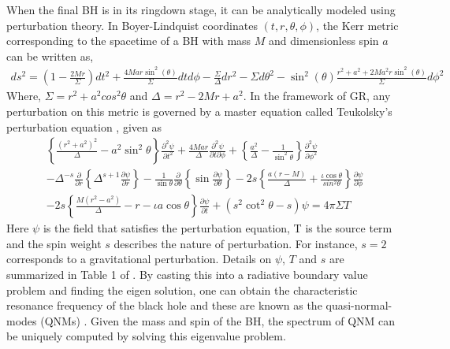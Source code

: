 When the final BH is in its ringdown stage, it can be analytically modeled using perturbation theory. In Boyer-Lindquist coordinates $(t, r, \theta, \phi )$, the Kerr metric corresponding to the spacetime of a BH with mass $M$ and dimensionless spin $a$ can be written as, 
\begin{align}
ds^{2}=(1 - \frac{2Mr}{\Sigma})dt^{2} + \frac{4Mar \sin^{2}(\theta)}{\Sigma} dtd\phi - \frac{\Sigma}{\Delta} dr^{2} - \Sigma d\theta^{2} -\sin^{2}(\theta)\frac{r^{2}+a^{2}+2Ma^{2}r \sin^{2}(\theta)}{\Sigma} d\phi^{2} 
\end{align}
Where, $\Sigma = r^{2} + a^{2} cos^{2} \theta$ and $\Delta = r^{2} - 2Mr + a^{2}$. In the framework of GR, any perturbation on this metric is governed by a master equation called Teukolsky's perturbation equation \cite{Teukolsky1,Teukolsky2, Teukolsky3} , given as
\begin{align*}
\left\lbrace \frac{(r^{2}+a^{2})^{2}}{\Delta} - a^{2} \sin^{2} \theta \right\rbrace \frac{\partial^{2}\psi}{\partial t^{2}} + \frac{4Mar}{\Delta} \frac{\partial^{2}\psi}{\partial t \partial \phi} + \left\lbrace \frac{a^{2}}{\Delta} - \frac{1}{\sin^{2} \theta}\right\rbrace \frac{\partial^{2}\psi}{\partial \phi^{2}} 
\\- \Delta^{-s} \frac{\partial}{\partial r} \left\lbrace \Delta^{s+1} \frac{\partial \psi}{\partial r} \right\rbrace - \frac{1}{\sin \theta} \frac{\partial}{\partial \theta} \left\lbrace \sin \frac{\partial \psi}{\partial \theta} \right\rbrace - 2s \left\lbrace\frac{a(r-M)}{\Delta} + \frac{\iota \cos \theta}{sin^{2} \theta} \right\rbrace \frac{\partial \psi}{\partial \phi} 
\\- 2s \left\lbrace \frac{M(r^{2}-a^{2})}{\Delta} - r - \iota a \cos \theta \right\rbrace \frac{\partial \psi}{\partial t} + (s^{2} \cot^{2}
 \theta -s)\psi = 4 \pi \Sigma T
 \end{align*}
Here $\psi$ is the field that satisfies the perturbation equation, T is the source term and the spin weight $s$ describes the nature of perturbation. For instance, $s=2$ corresponds to a gravitational perturbation. Details on $\psi$, $T$ and $s$ are summarized in Table 1 of \cite{Teukolsky1}. By casting this into a radiative boundary value problem and finding the eigen solution, one can obtain the characteristic resonance frequency of the black hole and these are known as the quasi-normal-modes (QNMs) \cite{10.2307/78902,1985RSPSA.402..285L}. Given the mass and spin of the BH, the spectrum of QNM can be uniquely computed by solving this eigenvalue problem. 

